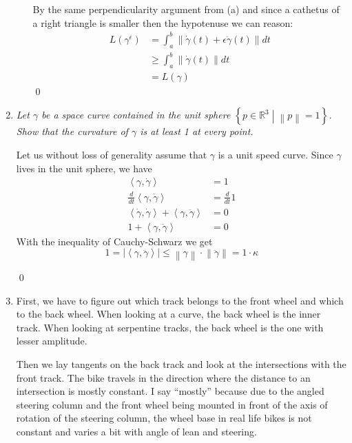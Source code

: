 \documentclass[a4paper,11pt,notitlepage,fullpage]{article}
\newcommand{\ez}{\qed}
\begin{document}
\begin{enumerate}
\begin{enumerate}
By the same perpendicularity argument from (a) and since a cathetus of a right triangle is smaller then the hypotenuse we can reason:
\begin{align*}
L(\gamma^\epsilon) &= \int_a^b \left\|\dot\gamma(t) + \epsilon\ddot\gamma(t)\right\| dt \\
&\geq \int_a^b \left\|\dot\gamma(t) \right\| dt \\
&= L(\gamma)
\end{align*}
\ez
\end{enumerate}

\item \emph{Let $\gamma$ be a space curve contained in the unit sphere $\left\{ p \in \mathbb R^3 \middle| \left\| p \right\| = 1 \right\}$. Show that the curvature of $\gamma$ is at least 1 at every point.}

Let us without loss of generality assume that $\gamma$ is a unit speed curve. Since $\gamma$ lives in the unit sphere, we have
\begin{align*}
\left\langle \gamma, \dot\gamma \right\rangle &= 1 \\
\frac{d}{dt} \left\langle \gamma, \dot\gamma \right\rangle &= \frac{d}{dt} 1 \\
\left\langle \dot\gamma, \dot\gamma \right\rangle + \left\langle \gamma, \ddot\gamma \right\rangle &= 0 \\
1 + \left\langle \gamma, \ddot\gamma \right\rangle &= 0
\end{align*}
With the inequality of Cauchy-Schwarz we get
\begin{equation*}
1 = |\left\langle \gamma, \ddot\gamma \right\rangle| \leq \left\| \gamma \right\| \cdot \left\| \ddot\gamma \right\| = 1 \cdot \kappa
\end{equation*}

\ez

\item First, we have to figure out which track belongs to the front wheel and which to the back wheel. When looking at a curve, the back wheel is the inner track. When looking at serpentine tracks, the back wheel is the one with lesser amplitude.

Then we lay tangents on the back track and look at the intersections with the front track. The bike travels in the direction where the distance to an intersection is mostly constant. I say ``mostly'' because due to the angled steering column and the front wheel being mounted in front of the axis of rotation of the steering column, the wheel base in real life bikes is not constant and varies a bit with angle of lean and steering.

\end{enumerate}
\end{document}

